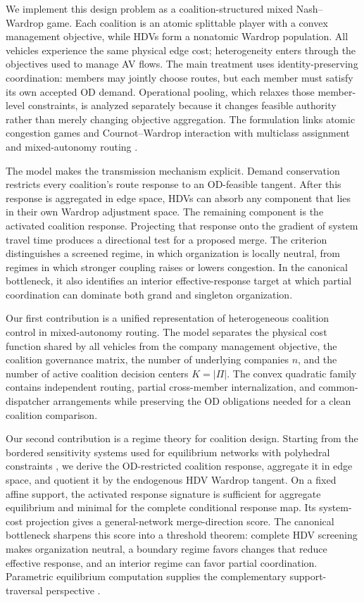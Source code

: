 We implement this design problem as a coalition-structured mixed Nash--Wardrop game. Each coalition is an atomic splittable player with a convex management objective, while HDVs form a nonatomic Wardrop population. All vehicles experience the same physical edge cost; heterogeneity enters through the objectives used to manage AV flows. The main treatment uses identity-preserving coordination: members may jointly choose routes, but each member must satisfy its own accepted OD demand. Operational pooling, which relaxes those member-level constraints, is analyzed separately because it changes feasible authority rather than merely changing objective aggregation. The formulation links atomic congestion games and Cournot--Wardrop interaction \citep{haurie1985,orda1993,harker1988,boulogne2002} with multiclass assignment \citep{dafermos1972} and mixed-autonomy routing \citep{mehr2019,lazar2021,biyik2021}.

The model makes the transmission mechanism explicit. Demand conservation
restricts every coalition's route response to an OD-feasible tangent. After
this response is aggregated in edge space, HDVs can absorb any component that
lies in their own Wardrop adjustment space. The remaining component is the
activated coalition response. Projecting that response onto the gradient of
system travel time produces a directional test for a proposed merge. The
criterion distinguishes a screened regime, in which organization is locally
neutral, from regimes in which stronger coupling raises or lowers congestion.
In the canonical bottleneck, it also identifies an interior effective-response
target at which partial coordination can dominate both grand and singleton
organization.

Our first contribution is a unified representation of heterogeneous coalition control in mixed-autonomy routing. The model separates the physical cost function shared by all vehicles from the company management objective, the coalition governance matrix, the number of underlying companies $n$, and the number of active coalition decision centers $K=|\Pi|$. The convex quadratic family contains independent routing, partial cross-member internalization, and common-dispatcher arrangements while preserving the OD obligations needed for a clean coalition comparison.

Our second contribution is a regime theory for coalition design. Starting from
the bordered sensitivity systems used for equilibrium networks with
polyhedral constraints \citep{tobin1988,qiu1989,patriksson2004,josefsson2006},
we derive the OD-restricted coalition response, aggregate it in edge space,
and quotient it by the endogenous HDV Wardrop tangent. On a fixed affine
support, the activated response signature is sufficient for aggregate
equilibrium and minimal for the complete conditional response map. Its
system-cost projection gives a general-network merge-direction score. The
canonical bottleneck sharpens this score into a threshold theorem: complete
HDV screening makes organization neutral, a boundary regime favors changes
that reduce effective response, and an interior regime can favor partial
coordination. Parametric equilibrium computation supplies the complementary
support-traversal perspective \citep{klimm2025}.

